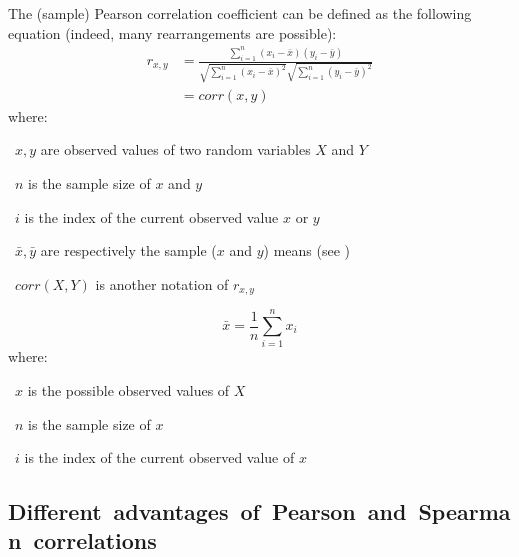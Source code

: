 The (sample) Pearson correlation coefficient can be defined
as the following equation
(indeed, many rearrangements are possible):
\begin{equation}\label{eq:PearsonCor}
    \tag{(Sample) Pearson correlation coefficient}
    \begin{split}
        r_{x,y} & = \frac{\sum ^n _{i=1}(x_i - \bar{x})(y_i - \bar{y})}{\sqrt{\sum ^n _{i=1}{(x_i - \bar{x})}^2}
        \sqrt{\sum ^n _{i=1}{(y_i - \bar{y})}^2}} \\
                & = corr(x,y)
    \end{split}
\end{equation}
where:
\quad\begin{eqlist}[\setlength{\itemsep}{0em}%
            \setlength{\topsep}{0em}%
            \setlength{\partopsep}{0em}%
            \setlength{\parskip}{0em}%
            \setlength{\parsep}{0em}]
    \item[\textbullet\ $x,y$] are observed values of two random variables $X$ and $Y$
    \item[\textbullet\ $n$] is the sample size of $x$ and $y$
    \item[\textbullet\ $i$] is the index of the current observed value $x$ or $y$
    \item[\textbullet\ $\bar{x}, \bar{y}$] are respectively the sample ($x$ and $y$) means (see )
    \item[\textbullet\ $corr(X,Y)$] is another notation of $r_{x,y}$
\end{eqlist}

\begin{equation}\label{eq:mean}
    \tag{Mean}
    \bar{x}=\frac{1}{n}\sum_{i=1}^n x_i
\end{equation}
where:
\quad\begin{eqlist}[\setlength{\itemsep}{0em}%
            \setlength{\topsep}{0em}%
            \setlength{\partopsep}{0em}%
            \setlength{\parskip}{0em}%
            \setlength{\parsep}{0em}]
    \item[\textbullet\ $x$] is the possible observed values of $X$
    \item[\textbullet\ $n$] is the sample size of $x$
    \item[\textbullet\ $i$] is the index of the current observed value of $x$
\end{eqlist}


\subsection{Different~advantages~of~Pearson~and~Spearman~correlations}\label{subsec:PearsonVsSpearman}

